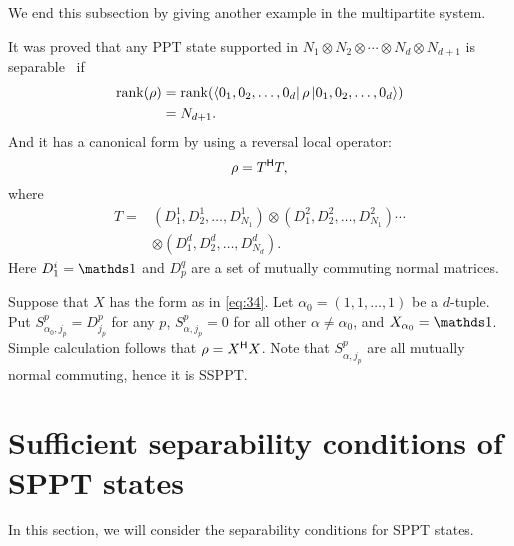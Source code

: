     We end this subsection by giving another example in the multipartite system.
    \begin{example}
      It was proved that any PPT state supported in $N_1 \otimes N_2\otimes \cdots\otimes  N_d\otimes N_{d+1}$ is separable~\cite{Wang2005a} if
      \begin{equation}
        \label{multiSPPTv0.6:eq:12}
        \begin{split}
          \mathrm{rank} (\rho) & = 
          \mathrm{rank} (\bra{0_1,0_2,\ldots,0_d} \rho \ket{0_1,0_2,\ldots,0_d}) \\
          &= N_{d+1}.
          \end{split}
      \end{equation}
    And it has a canonical form by using a reversal local operator:
    \begin{equation}
      \label{multiSPPTv0.6:eq:13}
      \rho = T^{\mathsf{H}}  T,
    \end{equation}
    where
    \begin{align*}T =& (D_1^1,D_2^1,\ldots,D_{N_1}^1)\otimes (D_1^2,D_2^2,\ldots,D_{N_1}^2)\cdots \\
     & \otimes (D_1^d,D_2^d,\ldots,D_{N_d}^{d}).
      \end{align*}
    Here $D_1^i = \I$ and
    $D_p^{q}$ are a set of mutually commuting normal matrices.
  \end{example}
  Suppose that  $X$ has the form as in \cref{eq:34}.
    Let $\alpha_0 = (1,1,\ldots,1)$ be a $d$-tuple.
    Put $S_{\alpha_0,j_p}^p = D_{j_p}^p$ for any $p$,  $S_{\alpha,j_p}^p = 0$ for all other $\alpha\neq
    \alpha_{0}$, and $X_{\alpha_0} = \I$. Simple calculation follows that $\rho = X^{\mathsf{H}} X$. Note that
    $S_{\alpha,j_p}^p$ are all mutually normal commuting, hence it is SSPPT.\@

    \section{Sufficient separability conditions of SPPT states}%
  \label{sec:suff-cond-sppt}

  In this section, we will consider the separability  conditions  for SPPT states.

